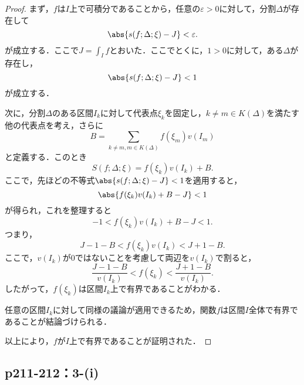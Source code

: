 \documentclass[a4paper,10pt,fleqn]{ltjsarticle}
\begin{document}
\begin{tleftbar}
	\begin{proof}
	まず，$f$は$I$上で可積分であることから，任意の$\varepsilon >0$に対して，分割$\Delta$が存在して
    \[
    \abs{s(f; \Delta; \xi) - J} < \varepsilon.
    \]
    が成立する．ここで$J = \int_I f$とおいた．ここでとくに，$1 >0$に対して，ある$\Delta$が存在し，
	\[
	\abs{ s(f; \Delta; \xi) - J } < 1
	\]
	が成立する．
	
	次に，分割$\Delta$のある区間$I_k$に対して代表点$\xi_k$を固定し，$k \ne m \in K(\Delta)$を満たす他の代表点を考え，さらに
	\[
	B = \sum_{k \ne m , m \in K(\Delta)} f(\xi_m) v(I_m)
	\]
	と定義する．このとき
	\[
	S(f; \Delta; \xi) = f(\xi_k) v(I_k) + B.
	\]
	ここで，先ほどの不等式$\abs{ s(f; \Delta; \xi) - J } < 1$を適用すると，
	\[
	\abs{ f(\xi_k) v(I_k) + B - J } < 1
	\]
	が得られ，これを整理すると
	\[
	-1 < f(\xi_k) v(I_k) + B - J < 1.
	\]
	つまり，
	\[
	J - 1 - B < f(\xi_k) v(I_k) < J + 1 - B.
	\]
	ここで，$v(I_k)$が$0$ではないことを考慮して両辺を$v(I_k)$で割ると，
	\[
	\frac{J - 1 - B}{v(I_k)} < f(\xi_k) < \frac{J + 1 - B}{v(I_k)}.
	\]
	したがって，$f(\xi_k)$は区間$I_k$上で有界であることがわかる．
	
	任意の区間$I_k$に対して同様の議論が適用できるため，関数$f$は区間$I$全体で有界であることが結論づけられる．
	
	以上により，$f$が$I$上で有界であることが証明された．
	\end{proof}
\end{tleftbar}

    \subsection*{p211-212：3-(i)}
\end{document}
